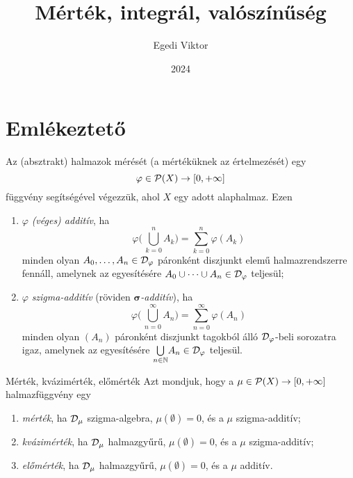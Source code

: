 \documentclass[
]{elteikthesis}[2024/04/26]
\title{Mérték, integrál, valószínűség} %
\date{2024} %
\author{Egedi Viktor}
\affiliation{egyetemi tanár} %
\begin{document}
	
	
	\section{Emlékeztető}
	
	Az (absztrakt) halmazok mérését (a mértéküknek az értelmezését) egy
	\[
		\varphi \in \mathcal{P}( X ) \to [0, +\infty]
	\]
	függvény segítségével végezzük, ahol \( X \) egy adott alaphalmaz. Ezen
	\begin{enumerate}
		\item \( \varphi \) \emph{(véges) additív}, ha
		\[
			\varphi \Biggl(\, \bigcup_{k=0}^n A_k \Biggr) = \sum_{k=0}^n \varphi(A_k)
		\]
		minden olyan \( A_0, \dots, A_n \in \mathcal{D}_{\varphi} \) páronként diszjunkt elemű halmazrendszerre fennáll, amelynek az egyesítésére
		\( A_0 \cup \cdots \cup A_n \in \mathcal{D}_{\varphi} \) teljesül;
		
		\item \( \varphi \) \emph{szigma-additív} 
		(röviden \emph{\( \boldsymbol{\sigma} \)-additív}), ha
		\[
			\varphi \Biggl(\, \bigcup_{n=0}^\infty A_n \Biggr) = 
			\sum_{n=0}^\infty \varphi(A_n)
		\]
		minden olyan \( (A_n) \) páronként diszjunkt tagokból álló 
		\( \mathcal{D}_{\varphi} \)-beli sorozatra igaz, amelynek az egyesítésére 
		\( \bigcup\limits_{n \in \mathbb{N}} \! A_n \in \mathcal{D}_{\varphi} \) teljesül.
	\end{enumerate}
	
	\begin{definition}{Mérték, kvázimérték, előmérték}{}
		Azt mondjuk, hogy a \( \mu \in \mathcal{P}( X ) \to [0, +\infty] \) halmazfüggvény egy
		\begin{enumerate}
			\item \emph{mérték}, ha \( \mathcal{D}_{\mu} \) szigma-algebra, \( \mu(\emptyset) = 0 \), és a \( \mu \) szigma-additív;
			
			\item \emph{kvázimérték}, ha \( \mathcal{D}_{\mu} \) halmazgyűrű, 
			\( \mu(\emptyset) = 0 \), és a \( \mu \) szigma-additív;
			
			\item \emph{előmérték}, ha \( \mathcal{D}_{\mu} \) halmazgyűrű, 
			\( \mu(\emptyset) = 0 \), és a \( \mu \) additív.
		\end{enumerate}
	\end{definition}
	
\end{document}

